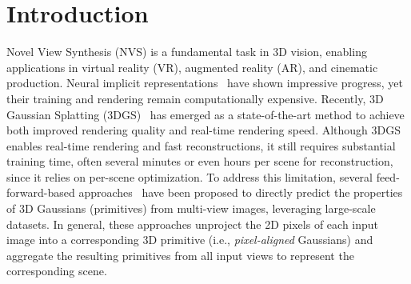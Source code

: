\section{Introduction}
\label{sec:intro}
Novel View Synthesis (NVS) is a fundamental task in 3D vision, enabling applications in virtual reality (VR), augmented reality (AR), and cinematic production. Neural implicit representations~\cite{mildenhall2020nerf, barron2021mip, barron2022mip, fridovich2022plenoxels, yu2021plenoctrees, muller2022instant, cao2023hexplane} have shown impressive progress, yet their training and rendering remain computationally expensive. Recently, 3D Gaussian Splatting (3DGS)~\cite{kerbl20233d} has emerged as a state-of-the-art method to achieve both improved rendering quality and real-time rendering speed. Although 3DGS enables real-time rendering and fast reconstructions, it still requires substantial training time, often several minutes or even hours per scene for reconstruction, since it relies on per-scene optimization. To address this limitation, several feed-forward-based approaches~\cite{charatan2024pixelsplat, szymanowicz2024splatter, chen2024mvsplat, xu2025depthsplat, kang2025selfsplat, ye2024no, huang2025no, zhang2024gs} have been proposed to directly predict the properties of 3D Gaussians (primitives) from multi-view images, leveraging large-scale datasets. In general, these approaches unproject the 2D pixels of each input image into a corresponding 3D primitive (i.e., \textit{pixel-aligned} Gaussians) and aggregate the resulting primitives from all input views to represent the corresponding scene.

